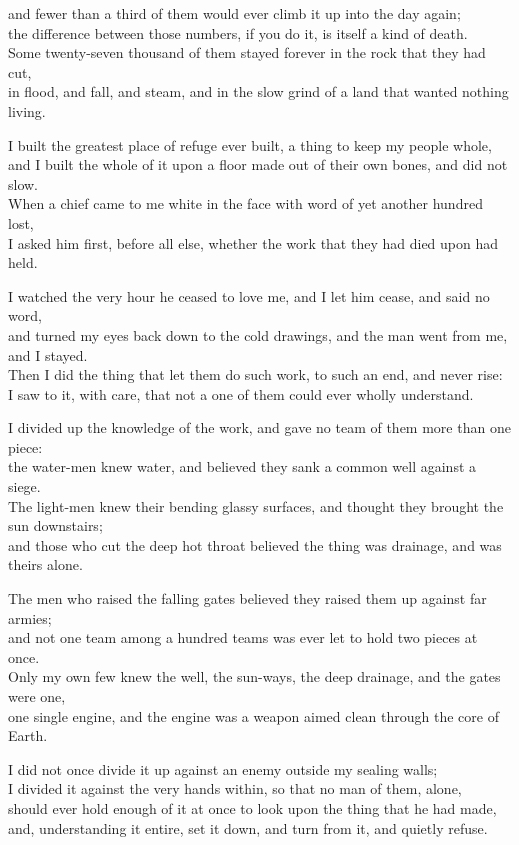 \begin{scripture}
and fewer than a third of them would ever climb it up into the day again; \\
the difference between those numbers, if you do it, is itself a kind of death. \\
Some twenty-seven thousand of them stayed forever in the rock that they had cut, \\
in flood, and fall, and steam, and in the slow grind of a land that wanted nothing living. \\
\medskip

I built the greatest place of refuge ever built, a thing to keep my people whole, \\
and I built the whole of it upon a floor made out of their own bones, and did not slow. \\
When a chief came to me white in the face with word of yet another hundred lost, \\
I asked him first, before all else, whether the work that they had died upon had held. \\
\medskip

I watched the very hour he ceased to love me, and I let him cease, and said no word, \\
and turned my eyes back down to the cold drawings, and the man went from me, and I stayed. \\
Then I did the thing that let them do such work, to such an end, and never rise: \\
I saw to it, with care, that not a one of them could ever wholly understand. \\
\medskip

I divided up the knowledge of the work, and gave no team of them more than one piece: \\
the water-men knew water, and believed they sank a common well against a siege. \\
The light-men knew their bending glassy surfaces, and thought they brought the sun downstairs; \\
and those who cut the deep hot throat believed the thing was drainage, and was theirs alone. \\
\medskip

The men who raised the falling gates believed they raised them up against far armies; \\
and not one team among a hundred teams was ever let to hold two pieces at once. \\
Only my own few knew the well, the sun-ways, the deep drainage, and the gates were one, \\
one single engine, and the engine was a weapon aimed clean through the core of Earth. \\
\medskip

I did not once divide it up against an enemy outside my sealing walls; \\
I divided it against the very hands within, so that no man of them, alone, \\
should ever hold enough of it at once to look upon the thing that he had made, \\
and, understanding it entire, set it down, and turn from it, and quietly refuse. \\
\end{scripture}

